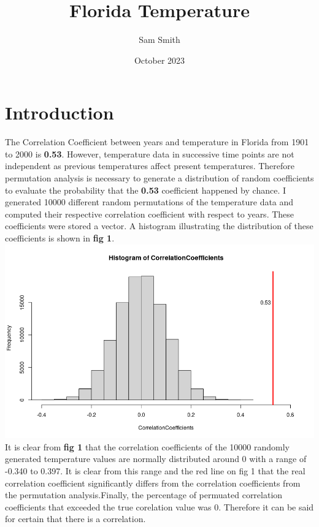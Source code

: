 \documentclass{article}
\title{Florida Temperature}
\author{Sam Smith}
\date{October 2023}
\begin{document}
\maketitle

\section{Introduction}

The Correlation Coefficient between years and temperature in Florida from 1901 to 2000 is \textbf{0.53}.
However, temperature data in successive time points are not independent as previous temperatures affect present temperatures. Therefore permutation analysis is necessary to generate a distribution of random coefficients to evaluate the probability that the \textbf{0.53} coefficient happened by chance. I generated 10000 different random permutations of the temperature data and computed their respective correlation coefficient with respect to years. These coefficients were stored a vector. A histogram illustrating the distribution of these coefficients is shown in \textbf{fig 1}.\\

\includegraphics[scale=0.4]{Hist.png}\\
It is clear from \textbf{fig 1} that the correlation coefficients of the 10000 randomly generated temperature values are normally distributed around 0 with a range of -0.340 to 0.397. It is clear from this range and the red line on fig 1 that the real correlation coefficient significantly differs from the correlation coefficients from the permutation analysis.Finally, the percentage of permuated correlation coefficients that exceeded the true corelation value was 0. Therefore it can be said for certain that there is a correlation.
\end{document}
